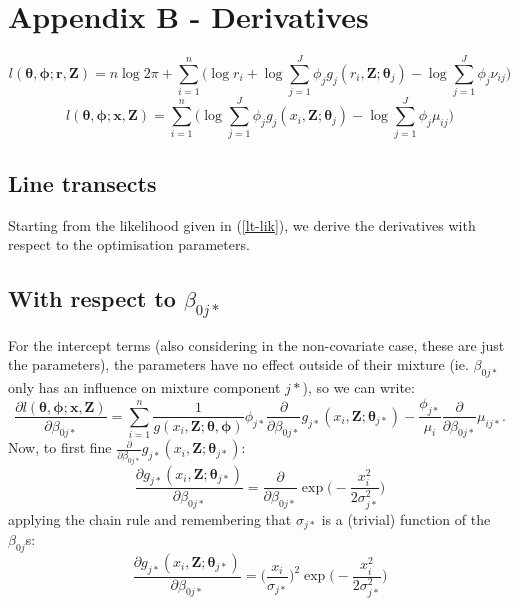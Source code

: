 \documentclass[useAMS,referee, usegraphicx]{biom}
\begin{document}
\section*{Appendix B - Derivatives}

\begin{equation}
l(\bm{\theta}, \bm{\phi}; \mathbf{r},\mathbf{Z}) = n \log 2 \pi + \sum_{i=1}^n \Big( \log r_i + \log \sum_{j=1}^J \phi_j g_j(r_i,\mathbf{Z}; \bm{\theta}_j) - \log \sum_{j=1}^J \phi_j \nu_{ij}\Big)
\label{pt-lik}
\end{equation}
\begin{equation}
l(\bm{\theta}, \bm{\phi}; \mathbf{x},\mathbf{Z}) = \sum_{i=1}^n \Big( \log \sum_{j=1}^J \phi_j g_j(x_i,\mathbf{Z}; \bm{\theta}_j) - \log \sum_{j=1}^J \phi_j \mu_{ij}\Big)
\label{lt-lik}
\end{equation}


\subsection*{Line transects}

Starting from the likelihood given in (\ref{lt-lik}), we derive the derivatives with respect to the optimisation parameters.

\subsection*{With respect to $\beta_{0j*}$}
For the intercept terms (also considering in the non-covariate case, these are just the parameters), the parameters have no effect outside of their mixture (ie. $\beta_{0j*}$ only has an influence on mixture component $j*$), so we can write:
\begin{equation*}
\frac{\partial l(\bm{\theta},\bm{\phi}; \mathbf{x},\mathbf{Z})}{\partial \beta_{0j*}} = \sum_{i=1}^n \frac{1}{g(x_i,\mathbf{Z}; \bm{\theta},\bm{\phi})} \phi_{j*} \frac{\partial}{\partial \beta_{0j*}} g_{j*}(x_i,\mathbf{Z}; \bm{\theta}_{j*})  - \frac{\phi_{j*}}{\mu_i}  \frac{\partial}{\partial \beta_{0j*}} \mu_{ij*}.
\end{equation*}
Now, to first fine $\frac{\partial}{\partial \beta_{0j*}} g_{j*}(x_i,\mathbf{Z}; \bm{\theta}_{j*})$:
\begin{equation*}
\frac{\partial g_{j*}(x_i,\mathbf{Z}; \bm{\theta}_{j*})}{\partial \beta_{0j*}} = \frac{\partial}{\partial \beta_{0j*}} \exp\Big( -\frac{x_i^2}{2\sigma_{j*}^2} \Big)
\end{equation*}
applying the chain rule and remembering that $\sigma_{j*}$ is a (trivial) function of the $\beta_{0j}$s:
\begin{equation*}
\frac{\partial g_{j*}(x_i,\mathbf{Z}; \bm{\theta}_{j*})}{\partial \beta_{0j*}} = \Big( \frac{x_i}{\sigma_{j*}}\Big)^2 \exp \Big(-\frac{x_i^2}{2 \sigma_{j*}^2}\Big)
\end{equation*}
\end{document}
